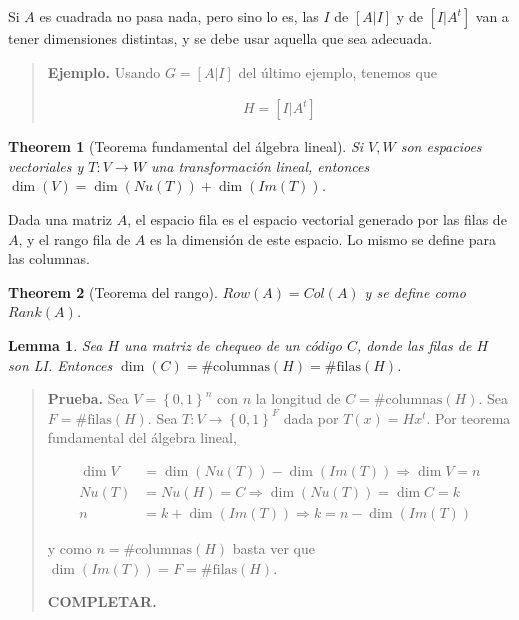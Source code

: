 \documentclass[a4paper]{article}
\newtheorem{lemma}{Lemma}
\newtheorem{theorem}{Theorem}
\newtheorem{lemma}{Lemma}
\newtheorem{theorem}{Theorem}
\begin{document}
Si $A$ es cuadrada no pasa nada, pero sino lo es, las $I$ de $[A|I]$ y de $[I |
A^t]$ van a tener dimensiones distintas, y se debe usar aquella que sea
adecuada.


\small
\begin{quote}

    \textbf{Ejemplo.} Usando $G = [A | I]$ del último ejemplo, tenemos que 

\begin{align*}
    H = [I | A^t]
\end{align*}

\end{quote}
\normalsize

\begin{theorem}[Teorema fundamental del álgebra lineal]
    Si $V, W$ son espacioes vectoriales y $T : V \to W$ una transformación lineal, 
    entonces $\dim(V) = \dim \left( Nu(T) \right) + \dim \left( Im (T) \right) $.
\end{theorem}

\begin{definition}
    Dada una matriz $A$, el espacio fila es el espacio vectorial generado por las filas 
    de $A$, y el rango fila de $A$ es la dimensión de este espacio. Lo mismo se define 
    para las columnas.
\end{definition}

\begin{theorem}[Teorema del rango]

    $Row(A) = Col(A)$ y se define como $Rank(A)$.
    
\end{theorem}

\begin{lemma}
    Sea $H$ una matriz de chequeo de un código $C$, donde las filas de $H$ son LI. 
    Entonces $\dim(C) = \# \text{columnas}(H) = \# \text{filas}(H)$.
\end{lemma}


\small
\begin{quote}

\textbf{Prueba.} Sea $V = \left\{ 0, 1 \right\}^n $ con $n$ la longitud de $C =
\#\text{columnas}(H)$. Sea $F = \#\text{filas}(H)$. Sea $T : V \to \left\{ 0, 1
\right\}^F $ dada por $T(x) = Hx^t$. Por teorema fundamental del álgebra lineal, 

\begin{align*}
    \dim V &= \dim (Nu (T)) - \dim (Im(T)) \Rightarrow \dim V = n \\ 
    Nu(T) &= Nu(H) = C \Rightarrow \dim (Nu(T)) = \dim C = k \\ 
    n &= k + \dim (Im(T)) \Rightarrow k = n - \dim (Im(T))
\end{align*}

y como $n = \# \text{columnas}(H)$ basta ver que $\dim(Im(T)) = F = \#
\text{filas}(H)$.

\textbf{COMPLETAR.}

\end{quote}
\normalsize
\end{document}

